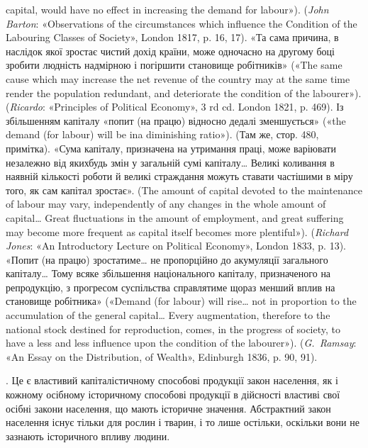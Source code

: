 {capital, would have no effect in increasing the demand for labour»). (\emph{John Barton}: «Observations of the circumstances which influence the Condition
of the Labouring Classes of Society», London 1817, p. 16, 17). «Та
сама причина, в наслідок якої зростає чистий дохід країни, може одночасно
на другому боці зробити людність надмірною і погіршити становище
робітників» («The same cause which may increase the net revenue of the country
may at the same time render the population redundant, and deteriorate
the condition of the labourer»). (\emph{Ricardo}: «Principles of Political Economy»,
3 rd cd. London 1821, p. 469). Із збільшенням капіталу «попит (на
працю) відносно дедалі зменшується» («the demand (for labour) will be ina diminishing
ratio»). (Там же, стор. 480, примітка). «Сума капіталу, призначена
на утримання праці, може варіювати незалежно від якихбудь змін
у загальній сумі капіталу\dots{} Великі коливання в наявній кількості роботи
й великі страждання можуть ставати частішими в міру того, як сам капітал
зростає». (The amount of capital devoted to the maintenance of labour
may vary, independently of any changes in the whole amount of capital\dots{}
Great fluctuations in the amount of employment, and great suffering may
become more frequent as capital itself becomes more plentiful»). (\emph{Richard Jones}: «An Introductory Lecture on Political Economy», London 1833, p. 13).
«Попит (на працю) зростатиме\dots{} не пропорційно до акумуляції загального
капіталу\dots{} Тому всяке збільшення національного капіталу, призначеного
на репродукцію, з прогресом суспільства справлятиме щораз
менший вплив на становище робітника» («Demand (for labour) will rise\dots{}
not in proportion to the accumulation of the general capital\dots{} Every
augmentation, therefore to the national stock destined for reproduction,
comes, in the progress of society, to have a less and less influence upon the
condition of the labourer»). (\emph{G.~Ramsay}: «An Essay on the Distribution,
of Wealth», Edinburgh 1836, p. 90, 91).

}. Це є властивий капіталістичному
способові продукції закон населення, як і кожному осібному
історичному способові продукції в дійсності властиві свої осібні
закони населення, що мають історичне значення. Абстрактний
закон населення існує тільки для рослин і тварин, і то лише
остільки, оскільки вони не зазнають історичного впливу людини.

